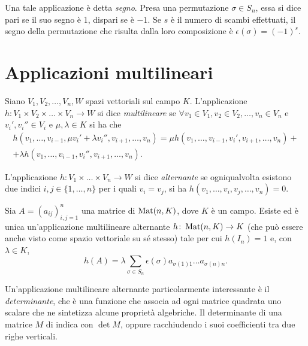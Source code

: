 Una tale applicazione è detta \emph{segno}.
Presa una permutazione $\sigma\in S_n$, essa si dice pari se il suo segno è 1, dispari se è $-1$.
Se $s$ è il numero di scambi effettuati, il segno della permutazione che risulta dalla loro composizione è $\epsilon(\sigma)=(-1)^s$.

\section{Applicazioni multilineari}
\begin{definizione} \label{d:applicazione-multilineare}
	Siano $V_1,V_2,\dots,V_n,W$ spazi vettoriali sul campo $K$.
	L'applicazione $h\colon V_1\times V_2\times\dots\times V_n\to W$ si dice \emph{multilineare} se $\forall v_1\in V_1,v_2\in V_2,\dots,v_n\in V_n$ e $v_i',v_i''\in V_i$ e $\mu,\lambda\in K$ si ha che
	\begin{multline*}
		h(v_1,\dots,v_{i-1},\mu v_i'+\lambda v_i'',v_{i+1},\dots,v_n)=\mu h(v_1,\dots,v_{i-1},v_i',v_{i+1},\dots,v_n)+\\+\lambda h(v_1,\dots,v_{i-1},v_i'',v_{i+1},\dots,v_n).
	\end{multline*}
\end{definizione}
\begin{definizione} \label{d:applicazione-multilineare-alternante}
	L'applicazione $h\colon V_1\times\dots\times V_n\to W$ si dice \emph{alternante} se ogniqualvolta esistono due indici $i,j\in\{1,\dots,n\}$ per i quali $v_i=v_j$, si ha $h(v_1,\dots,v_i,v_j,\dots,v_n)=0$.
\end{definizione}
\begin{teorema}[di unicità] \label{t:unicita-applicazione-multilinare-alternante}
	Sia $A=(a_{ij})_{i,j=1}^n$ una matrice di $\operatorname{Mat}(n,K)$, dove $K$ è un campo.
	Esiste ed è unica un'applicazione multilineare alternante $h\colon\operatorname{Mat}(n,K)\to K$ (che può essere anche visto come spazio vettoriale su sé stesso) tale per cui $h(I_n)=1$ e, con $\lambda\in K$, 
	\begin{equation*}
		h(A)=\lambda\sum_{\sigma\in S_n}\epsilon(\sigma)a_{\sigma(1)1}\dots a_{\sigma(n)n}.
	\end{equation*}
\end{teorema}
Un'applicazione multilineare alternante particolarmente interessante è il \emph{determinante}, che è una funzione che associa ad ogni matrice quadrata uno scalare che ne sintetizza alcune proprietà algebriche.
Il determinante di una matrice $M$ di indica con $\det M$, oppure racchiudendo i suoi coefficienti tra due righe verticali.

